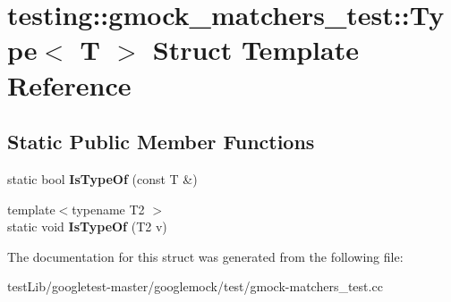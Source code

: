 \hypertarget{structtesting_1_1gmock__matchers__test_1_1Type}{}\section{testing\+:\+:gmock\+\_\+matchers\+\_\+test\+:\+:Type$<$ T $>$ Struct Template Reference}
\label{structtesting_1_1gmock__matchers__test_1_1Type}
\subsection*{Static Public Member Functions}
\begin{DoxyCompactItemize}
\item 
\mbox{\label{structtesting_1_1gmock__matchers__test_1_1Type_ad0b8d166a185471db49aa9009520d74f}} 
static bool {\bfseries Is\+Type\+Of} (const T \&)
\item 
\mbox{\label{structtesting_1_1gmock__matchers__test_1_1Type_a5451b10be4ff47bd2dc3741eb70dde59}} 
{\footnotesize template$<$typename T2 $>$ }\\static void {\bfseries Is\+Type\+Of} (T2 v)
\end{DoxyCompactItemize}


The documentation for this struct was generated from the following file\+:\begin{DoxyCompactItemize}
\item 
test\+Lib/googletest-\/master/googlemock/test/gmock-\/matchers\+\_\+test.\+cc\end{DoxyCompactItemize}

